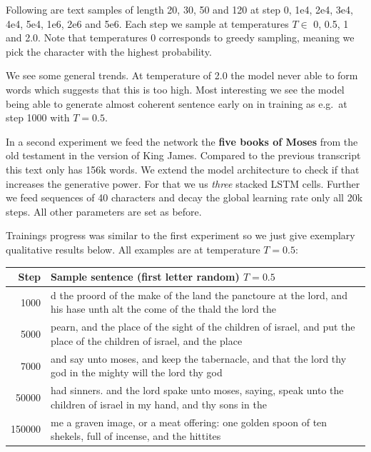 \documentclass{article}
\begin{document}
Following are text samples of length 20, 30, 50 and 120 at step 0, 1e4, 2e4, 3e4, 4e4, 5e4, 1e6, 2e6 and 5e6.
Each step we sample at temperatures \(T\in\) 0, 0.5, 1 and 2.0.
Note that temperatures 0 corresponds to greedy sampling, meaning we pick the character with the highest probability.

\vspace{1em}

\vspace{1em}

We see some general trends.
At temperature of 2.0 the model never able to form words which suggests that this is too high.
Most interesting we see the model being able to generate almost coherent sentence early on in training as e.g.\ at step 1000 with \(T=0.5\).

In a second experiment we feed the network the \textbf{five books of Moses} from the old testament in the version of King James.
Compared to the previous transcript this text only has 156k words.
We extend the model architecture to check if that increases the generative power.
For that we us \textit{three} stacked LSTM cells.
Further we feed sequences of 40 characters and decay the global learning rate only all 20k steps.
All other parameters are set as before.

Trainings progress was similar to the first experiment so we just give exemplary qualitative results below. All examples are at temperature \(T=0.5\):

\begin{tabularx}{\linewidth}{rX}
  Step & Sample sentence (first letter random) \(T=0.5\)\\\toprule
  1000 & d the proord of the make of the land the panctoure at the lord, and his hase unth alt the come of the thald the lord the\\
  5000 & pearn, and the place of the sight of the children of israel, and put the place of the children of israel, and the place\\
  7000 & and say unto moses, and keep the tabernacle, and that the lord thy god in the mighty will the lord thy god\\
  50000 &  had sinners. and the lord spake unto moses, saying, speak unto the children of israel in my hand, and thy sons in the\\
  150000 & me a graven image, or a meat offering: one golden spoon of ten shekels, full of incense, and the hittites\\ \bottomrule
\end{tabularx}
\end{document}

